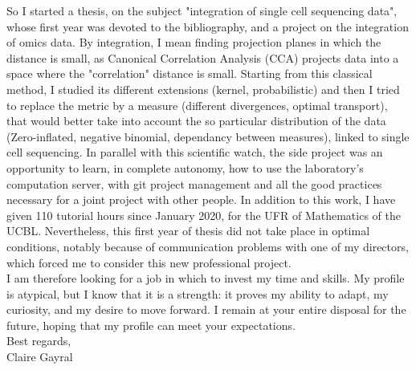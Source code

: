 \documentclass[a4paper,12pt]{article}
\begin{document}
So I started a thesis, on the subject "integration of single cell sequencing data", whose first year was devoted to the bibliography, and a project on the integration of omics data. 
%
By integration, I mean finding projection planes in which the distance is small, as Canonical Correlation Analysis (CCA) projects data into a space where the "correlation" distance is small. Starting from this classical method, I studied its different extensions (kernel, probabilistic) and then I tried to replace the metric by a measure (different divergences, optimal transport), that would better take into account the so particular distribution of the data (Zero-inflated, negative binomial, dependancy between measures), linked to single cell sequencing. 
In parallel with this scientific watch, the side project was an opportunity to learn, in complete autonomy, how to use the laboratory's computation server, with git project management and all the good practices necessary for a joint project with other people.
In addition to this work, I have given 110 tutorial hours since January 2020, for the UFR of Mathematics of the UCBL. 
Nevertheless, this first year of thesis did not take place in optimal conditions, notably because of communication problems with one of my directors, which forced me to consider this new professional project.
\\

I am therefore looking for a job in which to invest my time and skills. My profile is atypical, but I know that it is a strength: it proves my ability to adapt, my curiosity, and my desire to move forward. 
I remain at your entire disposal for the future, hoping that my profile can meet your expectations. \\

Best regards,\\

Claire Gayral
\end{document}
